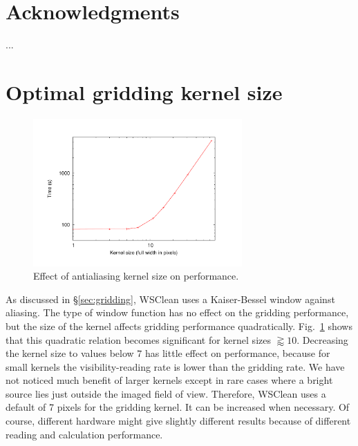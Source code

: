 \documentclass[useAMS,usenatbib]{mn2e}
\DeclareRobustCommand{\TUSSEN}[3]{#2}
\begin{document}
\section*{Acknowledgments}
...
\appendix

\section{Optimal gridding kernel size} \label{sec:gridding-appendix}
\begin{figure}
\begin{center}
\includegraphics[width=8cm]{img/benchmark-kernelsize/kernel}
\caption{Effect of antialiasing kernel size on performance.}
\label{fig:timing-kernelsize}
\end{center}
\end{figure}
As discussed in \S\ref{sec:gridding}, WSClean uses a Kaiser-Bessel window against aliasing. The type of window function has no effect on the gridding performance, but the size of the kernel affects gridding performance quadratically. Fig.~\ref{fig:timing-kernelsize} shows that this quadratic relation becomes significant for kernel sizes $\gtrapprox 10$. Decreasing the kernel size to values below $7$ has little effect on performance, because for small kernels the visibility-reading rate is lower than the gridding rate. We have not noticed much benefit of larger kernels except in rare cases where a bright source lies just outside the imaged field of view. Therefore, WSClean uses a default of 7 pixels for the gridding kernel. It can be increased when necessary. Of course, different hardware might give slightly different results because of different reading and calculation performance.

\DeclareRobustCommand{\TUSSEN}[3]{#3}




\label{lastpage}
\end{document}
